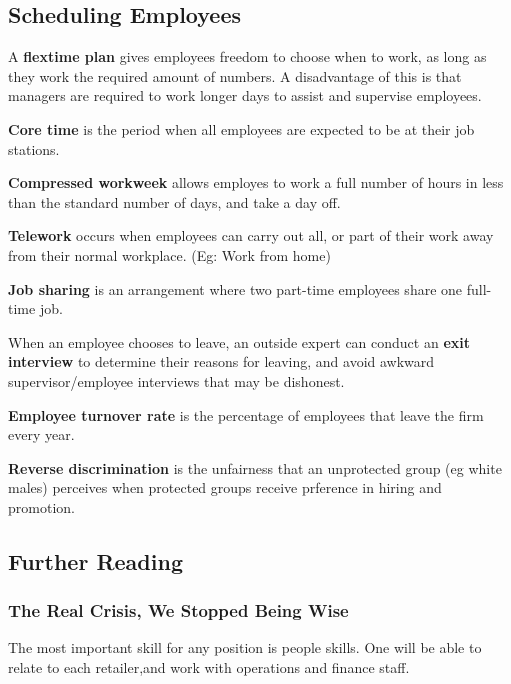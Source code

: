 \documentclass[english, 12pt]{article}
\begin{document}
\subsection{Scheduling Employees}
\begin{defn}
A \textbf{flextime plan} gives employees freedom to choose when to work, as long as they work the required amount of numbers. A disadvantage of this is that managers are required to work longer days to assist and supervise employees.
\end{defn}
\begin{defn}
\textbf{Core time} is the period when all employees are expected to be at their job stations.
\end{defn}
\begin{defn}
\textbf{Compressed workweek} allows employes to work a full number of hours in less than the standard number of days, and take a day off.
\end{defn}
\begin{defn}
\textbf{Telework} occurs when employees can carry out all, or part of their work away from their normal workplace. (Eg: Work from home)
\end{defn}
\begin{defn}
\textbf{Job sharing} is an arrangement where two part-time employees share one full-time job.
\end{defn}
\begin{defn}
When an employee chooses to leave, an outside expert can conduct an \textbf{exit interview} to determine their reasons for leaving, and avoid awkward supervisor/employee interviews that may be dishonest.
\end{defn}
\begin{defn}
\textbf{Employee turnover rate} is the percentage of employees that leave the firm every year.
\end{defn}
\begin{defn}
\textbf{Reverse discrimination} is the unfairness that an unprotected group (eg white males) perceives when protected groups receive prference in hiring and promotion.
\end{defn}
\subsection*{Further Reading}
\subsubsection*{The Real Crisis, We Stopped Being Wise}
The most important skill for any position is people skills. One will be able to relate to each retailer,and work with operations and finance staff. 
\end{document}
